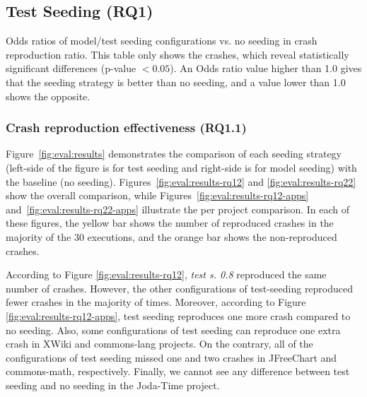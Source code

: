 \subsection{Test Seeding (RQ1)}


\begin{table}[t]
    \center
    \caption{Odds ratios of model/test seeding configurations vs. no seeding in crash reproduction ratio. This table only shows the crashes, which reveal statistically significant differences (p-value $< 0.05$). An Odds ratio value higher than 1.0 gives that the seeding strategy is better than no seeding, and a value lower than 1.0 shows the opposite.}
	\label{tab:oddratios}
	\footnotesize
	\subfloat{}
    \subfloat{}
\end{table}

\subsubsection{Crash reproduction effectiveness (\textbf{RQ1.1})}

Figure~\ref{fig:eval:results} demonstrates the comparison of each seeding strategy (left-side of the figure is for test seeding and right-side is for model seeding) with the baseline (no seeding). Figures~\ref{fig:eval:results-rq12} and \ref{fig:eval:results-rq22} show the overall comparison, while Figures~\ref{fig:eval:results-rq12-apps} and~\ref{fig:eval:results-rq22-apps} illustrate the per project comparison. In each of these figures, the yellow bar shows the number of reproduced crashes in the majority of the 30 executions, and the orange bar shows the non-reproduced crashes.

According to Figure \ref{fig:eval:results-rq12}, \textit{test s. 0.8} reproduced the same number of crashes. However, the other configurations of test-seeding reproduced fewer crashes in the majority of times. Moreover, according to Figure \ref{fig:eval:results-rq12-apps}, test seeding reproduces one more crash compared to no seeding. Also, some configurations of test seeding can reproduce one extra crash in  XWiki and commons-lang projects. On the contrary, all of the configurations of test seeding missed one and two crashes in JFreeChart and commons-math, respectively. Finally, we cannot see any difference between test seeding and no seeding in the Joda-Time project.
 
